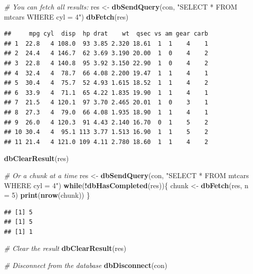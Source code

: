 \documentclass[
]{book}
\newenvironment{Shaded}{\begin{snugshade}}{\end{snugshade}}
\newcommand{\AttributeTok}[1]{\textcolor[rgb]{0.13,0.29,0.53}{#1}}
\newcommand{\CommentTok}[1]{\textcolor[rgb]{0.56,0.35,0.01}{\textit{#1}}}
\newcommand{\ControlFlowTok}[1]{\textcolor[rgb]{0.13,0.29,0.53}{\textbf{#1}}}
\newcommand{\DecValTok}[1]{\textcolor[rgb]{0.00,0.00,0.81}{#1}}
\newcommand{\FunctionTok}[1]{\textcolor[rgb]{0.13,0.29,0.53}{\textbf{#1}}}
\newcommand{\NormalTok}[1]{#1}
\newcommand{\OtherTok}[1]{\textcolor[rgb]{0.56,0.35,0.01}{#1}}
\newcommand{\SpecialCharTok}[1]{\textcolor[rgb]{0.81,0.36,0.00}{\textbf{#1}}}
\newcommand{\StringTok}[1]{\textcolor[rgb]{0.31,0.60,0.02}{#1}}
\begin{document}
\begin{Shaded}
\begin{Highlighting}[]
\CommentTok{\# You can fetch all results:}
\NormalTok{res }\OtherTok{\textless{}{-}} \FunctionTok{dbSendQuery}\NormalTok{(con, }\StringTok{"SELECT * FROM mtcars WHERE cyl = 4"}\NormalTok{)}
\FunctionTok{dbFetch}\NormalTok{(res)}
\end{Highlighting}
\end{Shaded}

\begin{verbatim}
##     mpg cyl  disp  hp drat    wt  qsec vs am gear carb
## 1  22.8   4 108.0  93 3.85 2.320 18.61  1  1    4    1
## 2  24.4   4 146.7  62 3.69 3.190 20.00  1  0    4    2
## 3  22.8   4 140.8  95 3.92 3.150 22.90  1  0    4    2
## 4  32.4   4  78.7  66 4.08 2.200 19.47  1  1    4    1
## 5  30.4   4  75.7  52 4.93 1.615 18.52  1  1    4    2
## 6  33.9   4  71.1  65 4.22 1.835 19.90  1  1    4    1
## 7  21.5   4 120.1  97 3.70 2.465 20.01  1  0    3    1
## 8  27.3   4  79.0  66 4.08 1.935 18.90  1  1    4    1
## 9  26.0   4 120.3  91 4.43 2.140 16.70  0  1    5    2
## 10 30.4   4  95.1 113 3.77 1.513 16.90  1  1    5    2
## 11 21.4   4 121.0 109 4.11 2.780 18.60  1  1    4    2
\end{verbatim}

\begin{Shaded}
\begin{Highlighting}[]
\FunctionTok{dbClearResult}\NormalTok{(res)}

\CommentTok{\# Or a chunk at a time}
\NormalTok{res }\OtherTok{\textless{}{-}} \FunctionTok{dbSendQuery}\NormalTok{(con, }\StringTok{"SELECT * FROM mtcars WHERE cyl = 4"}\NormalTok{)}
\ControlFlowTok{while}\NormalTok{(}\SpecialCharTok{!}\FunctionTok{dbHasCompleted}\NormalTok{(res))\{}
\NormalTok{  chunk }\OtherTok{\textless{}{-}} \FunctionTok{dbFetch}\NormalTok{(res, }\AttributeTok{n =} \DecValTok{5}\NormalTok{)}
  \FunctionTok{print}\NormalTok{(}\FunctionTok{nrow}\NormalTok{(chunk))}
\NormalTok{\}}
\end{Highlighting}
\end{Shaded}

\begin{verbatim}
## [1] 5
## [1] 5
## [1] 1
\end{verbatim}

\begin{Shaded}
\begin{Highlighting}[]
\CommentTok{\# Clear the result}
\FunctionTok{dbClearResult}\NormalTok{(res)}

\CommentTok{\# Disconnect from the database}
\FunctionTok{dbDisconnect}\NormalTok{(con)}
\end{Highlighting}
\end{Shaded}
\end{document}
